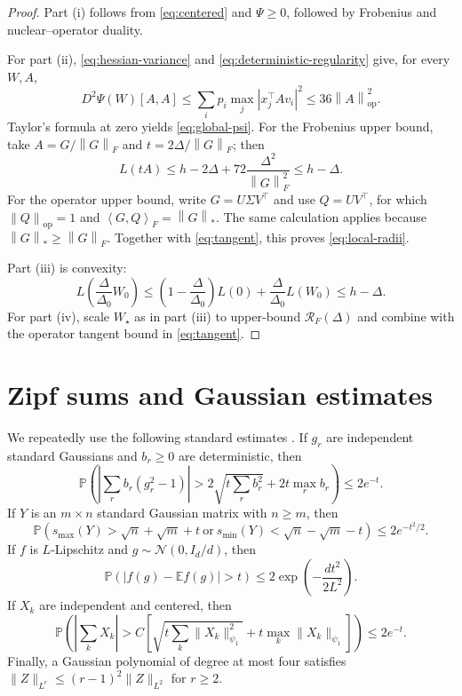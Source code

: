 \documentclass[11pt]{article}
\theoremstyle{definition}
\newcommand{\Pp}{\mathbb P}
\newcommand{\Ee}{\mathbb E}
\newcommand{\cN}{\mathcal N}
\newcommand{\Id}{I}
\newcommand{\ip}[2]{\left\langle #1,#2\right\rangle_F}
\newcommand{\normF}[1]{\left\lVert #1\right\rVert_F}
\newcommand{\normop}[1]{\left\lVert #1\right\rVert_{\mathrm{op}}}
\newcommand{\normnuc}[1]{\left\lVert #1\right\rVert_*}
\begin{document}
\begin{proof}
Part (i) follows from \eqref{eq:centered} and $\Psi\geq0$, followed by
Frobenius and nuclear--operator duality.

For part (ii), \eqref{eq:hessian-variance} and
\eqref{eq:deterministic-regularity} give, for every $W,A$,
\[
 D^2\Psi(W)[A,A]
 \leq\sum_i p_i\max_j|x_j^\top Av_i|^2
 \leq36\normop{A}^2.
\]
Taylor's formula at zero yields \eqref{eq:global-psi}.  For the
Frobenius upper bound, take $A=G/\normF{G}$ and
$t=2\Delta/\normF{G}$; then
\[
 L(tA)\leq h-2\Delta+72\frac{\Delta^2}{\normF{G}^2}
 \leq h-\Delta.
\]
For the operator upper bound, write $G=U\Sigma V^\top$ and use
$Q=UV^\top$, for which $\normop{Q}=1$ and
$\ip{G}{Q}=\normnuc{G}$.  The same calculation applies because
$\normnuc{G}\geq\normF{G}$.  Together with \eqref{eq:tangent}, this
proves \eqref{eq:local-radii}.

Part (iii) is convexity:
\[
 L\left(\frac\Delta{\Delta_0}W_0\right)
 \leq\left(1-\frac\Delta{\Delta_0}\right)L(0)
 +\frac\Delta{\Delta_0}L(W_0)
 \leq h-\Delta.
\]
For part (iv), scale $W_\star$ as in part (iii) to upper-bound
$\mathcal R_F(\Delta)$ and combine with the operator tangent bound in
\eqref{eq:tangent}.
\end{proof}

\section{Zipf sums and Gaussian estimates}

We repeatedly use the following standard estimates
\cite{vershynin,janson}.  If $g_r$ are independent standard Gaussians
and $b_r\geq0$ are deterministic, then
\begin{equation}
 \Pp\!\left(
 \left|\sum_r b_r(g_r^2-1)\right|
 >2\sqrt{t\sum_r b_r^2}+2t\max_r b_r
 \right)\leq2e^{-t}.
 \label{eq:weighted-chi-square}
\end{equation}
If $Y$ is an $m\times n$ standard Gaussian matrix with $n\geq m$, then
\begin{equation}
 \Pp\!\left(
 s_{\max}(Y)>\sqrt n+\sqrt m+t
 \ \text{or}\ 
 s_{\min}(Y)<\sqrt n-\sqrt m-t
 \right)\leq2e^{-t^2/2}.
 \label{eq:gaussian-singular-values}
\end{equation}
If $f$ is $L$-Lipschitz and $g\sim\cN(0,\Id_d/d)$, then
\begin{equation}
 \Pp(|f(g)-\Ee f(g)|>t)\leq
 2\exp\!\left(-\frac{dt^2}{2L^2}\right).
 \label{eq:gaussian-lipschitz}
\end{equation}
If $X_k$ are independent and centered, then
\begin{equation}
 \Pp\!\left(
 \left|\sum_kX_k\right|>
 C\left[
 \sqrt{t\sum_k\|X_k\|_{\psi_1}^2}
 +t\max_k\|X_k\|_{\psi_1}
 \right]
 \right)\leq2e^{-t}.
 \label{eq:subexponential-bernstein}
\end{equation}
Finally, a Gaussian polynomial of degree at most four satisfies
$\|Z\|_{L^r}\leq(r-1)^2\|Z\|_{L^2}$ for $r\geq2$.
\end{document}
